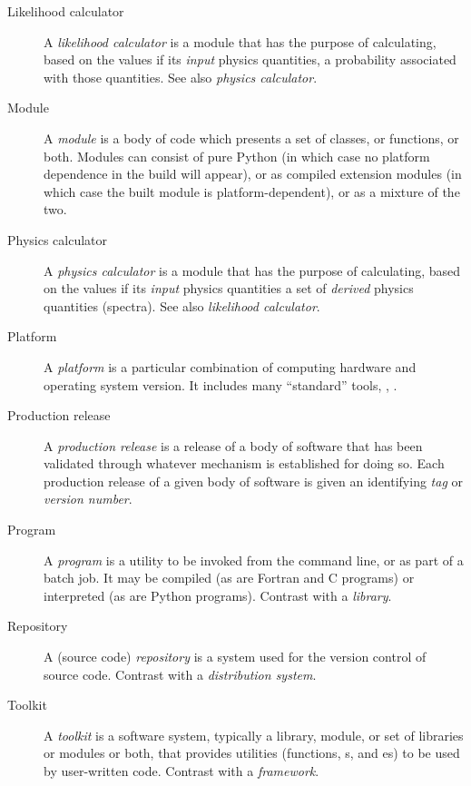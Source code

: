 \documentclass[draftmode,draftwater]{memarticle}
\begin{document}
\begin{description}
\item[Likelihood calculator] A \emph{likelihood calculator} is a module
  that has the purpose of calculating, based on the values if its
  \emph{input} physics quantities, a probability associated with those
  quantities. See also \emph{physics calculator}.

\item[Module] A \emph{module} is a body of code which presents a set
  of classes, or functions, or both. Modules can consist of pure
  Python (in which case no platform dependence in the build will
  appear), or as compiled extension modules (in which case the built
  module is platform-dependent), or as a mixture of the two.

\item[Physics calculator] A \emph{physics calculator} is a module
  that has the purpose of calculating, based on the values if its
  \emph{input} physics quantities a set of \emph{derived} physics
  quantities (\eg spectra).
  See also \emph{likelihood calculator}.

\item[Platform] A \emph{platform} is a particular combination of
  computing hardware and operating system version. It includes many
  ``standard'' tools, \eg, .

\item[Production release] A \emph{production release} is a release of a
  body of software that has been validated through whatever mechanism is
  established for doing so. Each production release of a given body of
  software is given an identifying \emph{tag} or \emph{version number}.

\item[Program] A \emph{program} is a utility to be
  invoked from the command line, or as part of a batch job. It may be
  compiled (as are Fortran and C programs) or interpreted (as are
  Python programs). Contrast with a \emph{library}.

\item[Repository] A (source code) \emph{repository} is a system used
  for the version control of source code. Contrast with a
  \emph{distribution system}.

\item[Toolkit] A \emph{toolkit} is a software system, typically a
  library, module, or set of libraries or modules or both, that
  provides utilities (functions, s, and es)
  to be used by user-written code. Contrast with a \emph{framework}.

\end{description}
\end{document}
